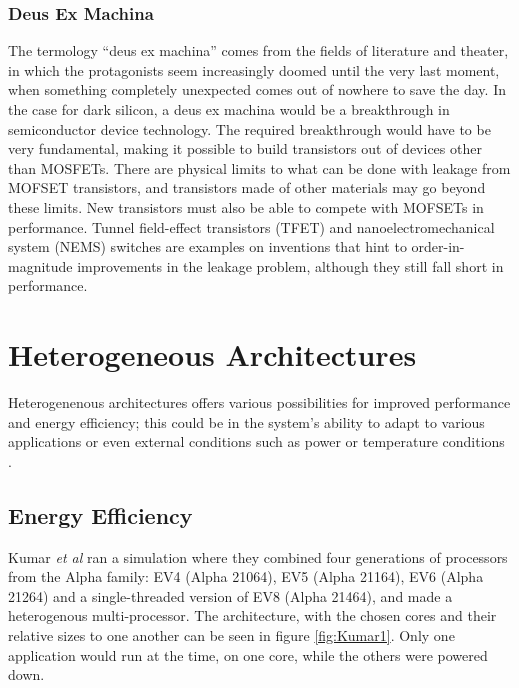 \subsubsection{Deus Ex Machina}
The termology ``deus ex machina'' comes from the fields of literature and theater, in which the protagonists seem increasingly doomed until the very last moment, when something completely unexpected comes out of nowhere to save the day.
In the case for dark silicon, a deus ex machina would be a breakthrough in semiconductor device technology.
The required breakthrough would have to be very fundamental, making it possible to build transistors out of devices other than MOSFETs. 
There are physical limits to what can be done with leakage from MOFSET transistors, and transistors made of other materials may go beyond these limits.
New transistors must also be able to compete with MOFSETs in performance.
Tunnel field-effect transistors (TFET) and nanoelectromechanical system (NEMS) switches are examples on inventions that hint to order-in-magnitude improvements in the leakage problem, although they still fall short in performance. \cite{dark-silicon}

\section{Heterogeneous Architectures}
\label{sec:heterogeneous}

Heterogenenous architectures offers various possibilities for improved performance and energy efficiency;
this could be in the system's ability to adapt to various applications or even external conditions such as
power or temperature conditions \cite{heterogeneous-ee, heterogeneous-perf, heterogeneous-arch}.

\subsection{Energy Efficiency}
\label{subsec:rw_ee} 
Kumar \textit{et al} \cite{heterogeneous-ee} ran a simulation where they combined four generations of processors from the Alpha family: EV4 (Alpha 21064), EV5 (Alpha 21164), EV6 (Alpha 21264) and a single-threaded version of EV8 (Alpha 21464), and made a heterogenous multi-processor.
The architecture, with the chosen cores and their relative sizes to one another can be seen in figure \ref{fig:Kumar1}.
Only one application would run at the time, on one core, while the others were powered down.

